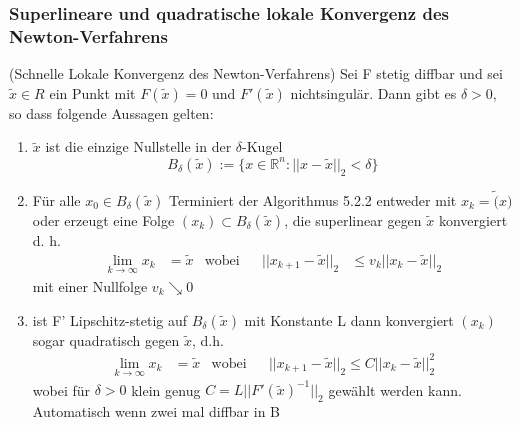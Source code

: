 \documentclass[
	ngerman,
	accentcolor=9c,%
	type=intern,
	marginpar=false
	]{tudapub}
\begin{document}
            \subsubsection{Superlineare und quadratische lokale Konvergenz des Newton-Verfahrens}
                \begin{satz}
                    (Schnelle Lokale Konvergenz des Newton-Verfahrens) Sei F stetig diffbar und sei $\tilde{x} \in R$ ein Punkt mit $F(\tilde{x}) = 0$ und $F'(\tilde{x})$ nichtsingulär.
                    Dann gibt es $\delta > 0$, so dass folgende Aussagen gelten:
                    \begin{enumerate}[label=\roman*)]
                        \item $\tilde{x}$ ist die einzige Nullstelle in der $\delta$-Kugel
                        \begin{equation*}
                            B_\delta(\tilde{x}) := \{x \in \mathbb{R}^n: ||x-\tilde{x}||_2 < \delta \}
                        \end{equation*}
                        \item Für alle $x_0 \in B_\delta(\tilde{x})$ Terminiert der Algorithmus 5.2.2 entweder mit $x_k = \tilde(x)$ oder erzeugt eine Folge $(x_k) \subset B_\delta(\tilde{x})$, die superlinear gegen
                        $\tilde{x}$ konvergiert d. h.
                        \begin{align*}
                            \lim_{k \rightarrow \infty} x_k &= \tilde{x} &\text{wobei}&& ||x_{k+1}-\tilde{x}||_2 &\leq v_k||x_k - \tilde{x}||_2
                        \end{align*}
                        mit einer Nullfolge $v_k \searrow 0$
                        \item ist F' Lipschitz-stetig auf $B_\delta(\tilde{x})$ mit Konstante L
                        dann konvergiert $(x_k)$ sogar quadratisch gegen $\tilde{x}$, d.h.
                        \begin{align*}
                            \lim_{k \rightarrow \infty} x_k &= \tilde{x} & \text{wobei} && ||x_{k+1} - \tilde{x}||_2 \leq C ||x_k - \tilde{x}||_2^2
                        \end{align*}
                        wobei für $\delta > 0$ klein genug $C = L ||F'(\tilde{x})^{-1}||_2$ gewählt werden kann.
                        Automatisch wenn zwei mal diffbar in B
                    \end{enumerate}
                    
                \end{satz}
\end{document}
